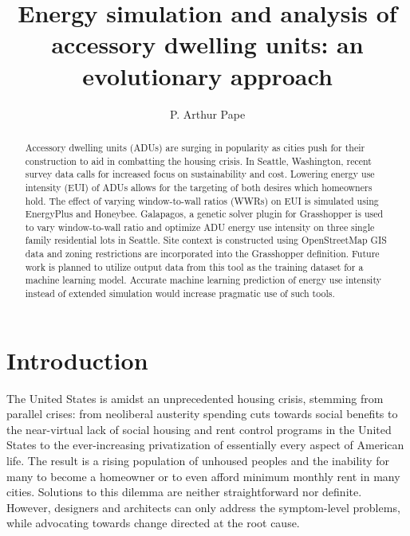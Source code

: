 \documentclass[sagev,times,Royal]{sagej}
\begin{document}

\title{Energy simulation and analysis of accessory dwelling units: 
an evolutionary approach}

\author{P. Arthur Pape}




\begin{abstract}
Accessory dwelling units (ADUs) are surging in popularity as cities push for their construction to aid in combatting the housing crisis. In Seattle, Washington, recent survey data calls for increased focus on sustainability and cost. Lowering energy use intensity (EUI) of ADUs allows for the targeting of both desires which homeowners hold. The effect of varying window-to-wall ratios (WWRs) on EUI is simulated using EnergyPlus and Honeybee. Galapagos, a genetic solver plugin for Grasshopper is used to vary window-to-wall ratio and optimize ADU energy use intensity on three single family residential lots in Seattle. Site context is constructed using OpenStreetMap GIS data and zoning restrictions are incorporated into the Grasshopper definition. Future work is planned to utilize output data from this tool as the training dataset for a machine learning model. Accurate machine learning prediction of energy use intensity instead of extended simulation would increase pragmatic use of such tools.
\end{abstract}


\maketitle

\section{Introduction}
The United States is amidst an unprecedented housing crisis, stemming from parallel crises: from neoliberal austerity spending cuts towards social benefits to the near-virtual lack of social housing and rent control programs in the United States to the ever-increasing privatization of essentially every aspect of American life\cite{10.2307/26297969}. The result is a rising population of unhoused peoples and the inability for many to become a homeowner or to even afford minimum monthly rent in many cities. Solutions to this dilemma are neither straightforward nor definite. However, designers and architects can only address the symptom-level problems, while advocating towards change directed at the root cause. 
\end{document}
